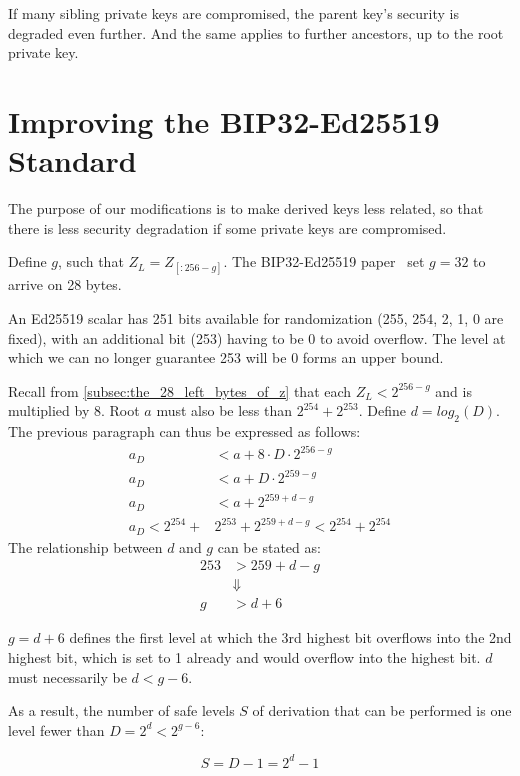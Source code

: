 \documentclass[12pt, a4paper, twocolumn]{article}
\begin{document}
If many sibling private keys are compromised, the parent key's security is degraded even further. And the same applies to further ancestors, up to the root private key.

\section{Improving the BIP32-Ed25519 Standard}

The purpose of our modifications is to make derived keys less related, so that there is less security degradation if some private keys are compromised.

Define $g$, such that $Z_L = Z_{[:256-g]}$. The BIP32-Ed25519 paper~\cite{BIP32-Ed25519} set $g=32$ to arrive on 28 bytes.

An Ed25519 scalar has 251 bits available for randomization (255, 254, 2, 1, 0 are fixed), with an additional bit (253) having to be 0 to avoid overflow. The level at which we can no longer guarantee 253 will be 0 forms an upper bound.

Recall from \cref{subsec:the_28_left_bytes_of_z} that each $Z_L < 2^{256 - g}$ and is multiplied by 8. Root $a$ must also be less than $2^{254} + 2^{253}$. Define $d = log_2(D)$. The previous paragraph can thus be expressed as follows:
\begin{align*}
  a_D &< a + 8\cdot D\cdot2^{256 - g} \\
  a_D &< a + D\cdot2^{259 - g} \\
  a_D &< a + 2^{259 + d - g}\\
  a_D < 2^{254} +& 2^{253} + 2^{259 + d - g} < 2^{254} + 2^{254}
\end{align*}
The relationship between $d$ and $g$ can be stated as:
\begin{align*}
  253 &> 259 + d - g \\
  &\Downarrow \\
  g &> d + 6
\end{align*}

 $g = d + 6$ defines the first level at which the 3rd highest bit overflows into the 2nd highest bit, which is set to 1 already and would overflow into the highest bit. $d$ must necessarily be $d < g - 6$.

 As a result, the number of safe levels $S$ of derivation that can be performed is one level fewer than $D = 2^{d} < 2^{g - 6}$:

 \begin{equation*}
  S = D - 1 = 2^{d} - 1
  \end{equation*}
\end{document}
